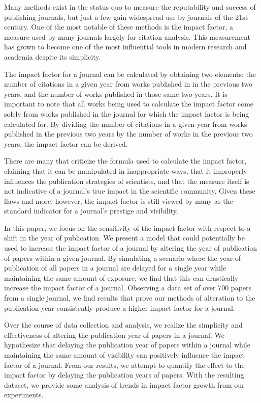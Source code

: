 \documentclass[times]{jtitauth}
\begin{document}
Many methods exist in the status quo to measure the reputability and success of publishing journals, but just a few gain widespread use by journals of the 21st century. One of the most notable of these methods is the impact factor, a measure used by many journals largely for citation analysis. This measurement has grown to become one of the most influential tools in modern research and academia despite its simplicity. 

The impact factor for a journal can be calculated by obtaining two elements: the number of citations in a given year from works published in in the previous two years, and the number of works published in those same two years. It is important to note that all works being used to calculate the impact factor come solely from works published in the journal for which the impact factor is being calculated for. By dividing the number of citations in a given year from works published in the previous two years by the number of works in the previous two years, the impact factor can be derived.

There are many that criticize the formula used to calculate the impact factor, claiming that it can be manipulated in inappropriate ways, that it improperly influences the publication strategies of scientists, and that the measure itself is not indicative of a journal’s true impact in the scientific community. Given these flaws and more, however, the impact factor is still viewed by many as the standard indicator for a journal’s prestige and visibility.

In this paper, we focus on the sensitivity of the impact factor with respect to a shift in the year of publication. We present a model that could potentially be used to increase the impact factor of a journal by altering the year of publication of papers within a given journal. By simulating a scenario where the year of publication of all papers in a journal are delayed for a single year while maintaining the same amount of exposure, we find that this can drastically increase the impact factor of a journal. Observing a data set of over 700 papers from a single journal, we find results that prove our methods of alteration to the publication year consistently produce a higher impact factor for a journal. 

Over the course of data collection and analysis, we realize the simplicity and effectiveness of altering the publication year of papers in a journal. We hypothesize that delaying the publication year of papers within a journal while maintaining the same amount of visibility can positively influence the impact factor of a journal. From our results, we attempt to quantify the effect to the impact factor by delaying the publication years of papers. With the resulting dataset, we provide some analysis of trends in impact factor growth from our experiments.
\end{document}
